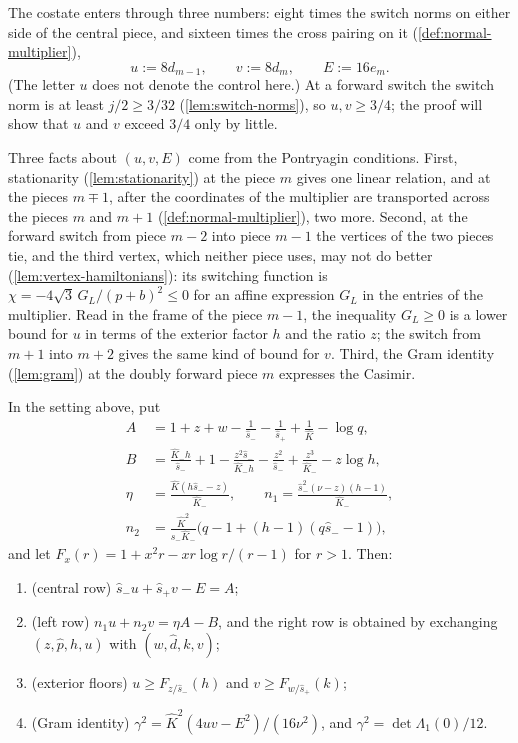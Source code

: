 The costate enters through three numbers: eight times the switch norms on either side of the
central piece, and sixteen times the cross pairing on it (\cref{def:normal-multiplier}),
\[
u:=8d_{m-1},\qquad v:=8d_m,\qquad E:=16e_m .
\]
(The letter $u$ does not denote the control here.) At a forward switch the switch norm is at least
$j/2\ge3/32$ (\cref{lem:switch-norms}), so $u,v\ge3/4$; the proof will show that $u$ and $v$ exceed
$3/4$ only by little.

Three facts about $(u,v,E)$ come from the Pontryagin conditions. First, stationarity
(\cref{lem:stationarity}) at the piece $m$ gives one linear relation, and at the pieces $m\mp1$,
after the coordinates of the multiplier are transported across the pieces $m$ and $m+1$
(\cref{def:normal-multiplier}), two more. Second, at the forward switch from piece $m-2$ into piece
$m-1$ the vertices of the two pieces tie, and the third vertex, which neither piece uses, may not do
better (\cref{lem:vertex-hamiltonians}): its switching function is $\chi=-4\sqrt3\,G_L/(p+b)^2\le0$
for an affine expression $G_L$ in the entries of the multiplier. Read in the frame of the piece
$m-1$, the inequality $G_L\ge0$ is a lower bound for $u$ in terms of the exterior factor $h$ and the
ratio $z$; the switch from $m+1$ into $m+2$ gives the same kind of bound for $v$. Third, the Gram
identity (\cref{lem:gram}) at the doubly forward piece $m$ expresses the Casimir.

\begin{proposition}\label{prop:fwd-window}
In the setting above, put
\begin{align*}
A&=1+z+w-\frac1{\hat s_-}-\frac1{\hat s_+}+\frac1{\hat K}-\log q,\\
B&=\frac{\hat K_-h}{\hat s_-}+1-\frac{z^2\hat s_-}{\hat K_-h}-\frac{z^2}{\hat s_-}
   +\frac{z^3}{\hat K_-}-z\log h,\\
\eta&=\frac{\hat K(h\hat s_--z)}{\hat K_-},\qquad
n_1=\frac{\hat s_-^2(\nu-z)(h-1)}{\hat K_-},\\
n_2&=\frac{\hat K^2}{\hat s_-\hat K_-}\bigl(q-1+(h-1)(q\hat s_--1)\bigr),
\end{align*}
and let $F_x(r)=1+x^2r-xr\log r/(r-1)$ for $r>1$. Then:
\begin{enumerate}
\item (central row) $\hat s_-u+\hat s_+v-E=A$;
\item (left row) $n_1u+n_2v=\eta A-B$, and the right row is obtained by exchanging
  $(z,\hat p,h,u)$ with $(w,\hat d,k,v)$;
\item (exterior floors) $u\ge F_{z/\hat s_-}(h)$ and $v\ge F_{w/\hat s_+}(k)$;
\item (Gram identity) $\gamma^2=\hat K^2(4uv-E^2)/(16\nu^2)$, and $\gamma^2=\det\Lambda_1(0)/12$.
\end{enumerate}
\end{proposition}

